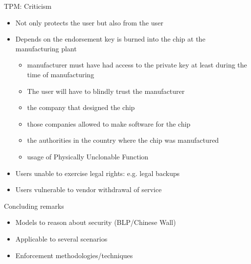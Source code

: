 \documentclass{beamer}
\begin{document}
\begin{frame}{TPM: Criticism}
  \begin{itemize}
    \item Not only protects the user but also from the user
    \item Depends on the endorsement key is burned into the
      chip at the manufacturing plant
      
      \begin{itemize}
      \item manufacturer must have had access to the private key at least
        during the time of manufacturing
      \item The user
        will have to blindly trust the manufacturer
      \item  the company that
        designed the chip
      \item those companies allowed to make software
        for the chip
      \item the authorities
      in the country where the chip was manufactured
      \item usage of Physically Unclonable Function
      \end{itemize}
      
    \item Users unable to exercise legal rights: e.g. legal backups
    \item Users vulnerable to vendor withdrawal of service
  \end{itemize}
\end{frame}

\begin{frame}{Concluding remarks}
  \begin{itemize}
    \item Models to reason about security (BLP/Chinese Wall)
    \item Applicable to several scenarios
    \item Enforcement methodologies/techniques
  \end{itemize}
\end{frame}
\end{document}

